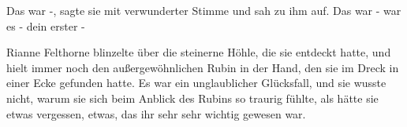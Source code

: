 \glqq Das war -\grqq{}, sagte sie mit verwunderter Stimme und sah zu ihm auf.
\glqq Das war - war es - dein erster -\grqq{}

Rianne Felthorne blinzelte über die steinerne Höhle, die sie entdeckt hatte, und
hielt immer noch den außergewöhnlichen Rubin in der Hand, den sie im Dreck in
einer Ecke gefunden hatte. Es war ein unglaublicher Glücksfall, und sie wusste
nicht, warum sie sich beim Anblick des Rubins so traurig fühlte, als hätte sie
etwas vergessen, etwas, das ihr sehr sehr wichtig gewesen war.

